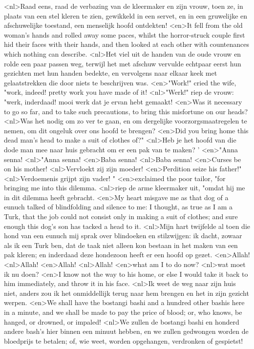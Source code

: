<nl>Raad eens, raad de verbazing van de kleermaker en zijn vrouw, toen ze, in plaats van een stel kleren te zien, gewikkeld in een servet, en in een gruwelijke en afschuwelijke toestand, een menselijk hoofd ontdekten!
<en>It fell from the old woman's hands and rolled away some paces, whilst the horror-struck couple first hid their faces with their hands, and then looked at each other with countenances which nothing can describe.
<nl>Het viel uit de handen van de oude vrouw en rolde een paar passen weg, terwijl het met afschuw vervulde echtpaar eerst hun gezichten met hun handen bedekte, en vervolgens naar elkaar keek met gelaatstrekken die door niets te beschrijven was.
<en>"Work!" cried the wife, "work, indeed! pretty work you have made of it!
<nl>"Werk!" riep de vrouw: "werk, inderdaad! mooi werk dat je ervan hebt gemaakt!
<en>Was it necessary to go so far, and to take such precautions, to bring this misfortune on our heads?
<nl>Was het nodig om zo ver te gaan, en om dergelijke voorzorgsmaatregelen te nemen, om dit ongeluk over ons hoofd te brengen?
<en>Did you bring home this dead man's head to make a suit of clothes of?"
<nl>Heb je het hoofd van die dode man mee naar huis gebracht om er een pak van te maken? '
<en>"Anna senna!
<nl>"Anna senna!
<en>Baba senna!
<nl>Baba senna!
<en>Curses be on his mother!
<nl>Vervloekt zij zijn moeder!
<en>Perdition seize his father!"
<nl>Verdoemenis grijpt zijn vader! "
<en>exclaimed the poor tailor, "for bringing me into this dilemma.
<nl>riep de arme kleermaker uit, "omdat hij me in dit dilemma heeft gebracht.
<en>My heart misgave me as that dog of a eunuch talked of blindfolding and silence to me: I thought, as true as I am a Turk, that the job could not consist only in making a suit of clothes; and sure enough this dog's son has tacked a head to it.
<nl>Mijn hart twijfelde al toen die hond van een eunuch mij sprak over blindoeken en stilzwijgen: ik dacht, zowaar als ik een Turk ben, dat de taak niet alleen kon bestaan in het maken van een pak kleren; en inderdaad deze hondezoon heeft er een hoofd op gezet.
<en>Allah!
<nl>Allah!
<en>Allah!
<nl>Allah!
<en>what am I to do now?
<nl>wat moet ik nu doen?
<en>I know not the way to his home, or else I would take it back to him immediately, and throw it in his face.
<nl>Ik weet  de weg naar zijn huis niet, anders zou ik het onmiddellijk terug naar hem brengen en het in zijn gezicht werpen.
<en>We shall have the bostangi bashi and a hundred other bashis here in a minute, and we shall be made to pay the price of blood; or, who knows, be hanged, or drowned, or impaled!
<nl>We zullen de bostangi bashi en honderd andere bash's hier binnen een minuut hebben, en we zullen gedwongen worden de bloedprijs te betalen; of, wie weet, worden opgehangen, verdronken of gespietst!
